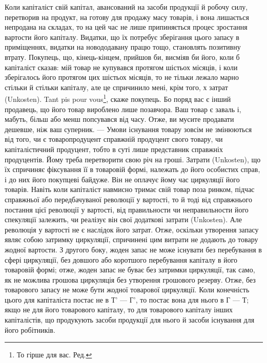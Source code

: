 Коли капіталіст свій капітал, авансований на засоби продукції й робочу
силу, перетворив на продукт, на готову для продажу масу товарів, і вона
лишається непродана на складах, то на цей час не лише припиняється
процес зростання вартости його капіталу. Видатки, що їх потребує зберігання
цього запасу в приміщеннях, видатки на новододавану працю тощо, становлять
позитивну втрату. Покупець, що, кінець-кінцем, прийшов би, висміяв
би його, коли б капіталіст сказав: мій товар не купувався протягом шістьох
місяців, і коли зберігалось його протягом цих шістьох місяців, то не
тільки лежало марно стільки й стільки капіталу, але це спричинило мені,
крім того, х затрат (Unkosten). Tant pis pour vous\footnote*{
То гірше для вас. Ред.
}, скаже покупець. Бо
поряд вас є інший продавець, що його товар вироблено лише позавчора.
Ваш товар є заваль і, мабуть, більш або менш попсувався від часу. Отже,
ви мусите продавати дешевше, ніж ваш суперник. — Умови існування
товару зовсім не змінюються від того, чи є товаропродуцент справжній
продуцент свого товару, чи капіталістичний продуцент, тобто в суті
лише представник справжніх продуцентів. Йому треба перетворити свою
річ на гроші. Затрати (Unkosten), що їх спричиняє фіксування її
в товаровій формі, належать до його особистих справ, і до них його
покупцеві байдуже. Він не оплачує йому час циркуляції його товарів.
Навіть коли капіталіст навмисно тримає свій товар поза ринком, підчас
справжньої або передбачуваної революції у вартості, то й тоді від
справжнього постання цієї революції у вартості, від правильности чи
неправильности його спекуляції залежить, чи реалізує він свої додаткові
затрати (Unkosten). Але революція у вартості не є наслідок його затрат.
Отже, оскільки утворення запасу являє собою затримку циркуляції, спричинені
цим витрати не додають до товару жодної вартости. З другого
боку, жоден запас не може існувати без перебування в сфері циркуляції,
без довшого або коротшого перебування капіталу в його товаровій
формі; отже, жоден запас не буває без затримки циркуляції, так само,
як не можлива грошова циркуляція без утворення грошового резерву.
Отже, без товарового запасу не може бути жодної товарової циркуляції.
Коли конечність цього для капіталіста постає не в Т' — Г', то постає
вона для нього в Г — Т; якщо не для його товарового капіталу, то
для товарового капіталу інших капіталістів, що продукують засоби продукції
для нього й засоби існування для його робітників.

